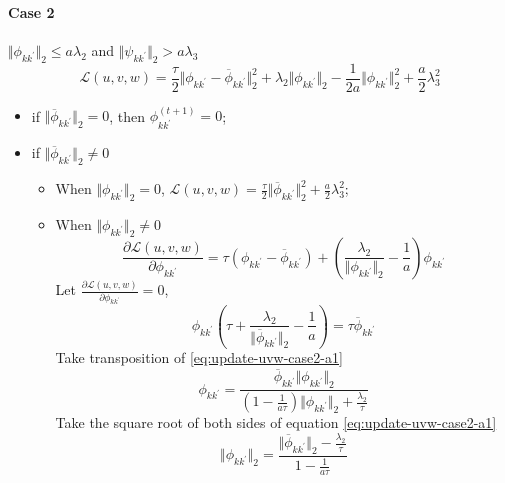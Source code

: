 \documentclass[12pt, a4paper, oneside]{article}
\numberwithin{equation}{section}
\begin{document}
\paragraph{Case 2} $\Vert\phi_{k{k^\prime}}\Vert_2 \leq a\lambda_2$ and $\Vert\psi_{k{k^\prime}}\Vert_2 > a\lambda_3$
\begin{equation}
	\label{eq:update_uvw-case2}
	\mathcal{L}(u,v,w) =  \frac{\tau}{2}\Vert\phi_{k{k^\prime}}-\overline\phi_{k{k^\prime}}\Vert_2^2 + \lambda_2 \Vert\phi_{k{k^\prime}}\Vert_2 - \frac{1}{2a}\Vert\phi_{k{k^\prime}}\Vert_2^2 + \frac{a}{2}\lambda_3^2
\end{equation}
\begin{itemize}
	\item if $\Vert\overline\phi_{k{k^\prime}}\Vert_2 = 0$, then $\phi^{(t+1)}_{k{k^\prime}} = 0$;
	\item if $\Vert\overline\phi_{k{k^\prime}}\Vert_2 \neq 0$
	\begin{itemize}
		\item When $\Vert\phi_{k{k^\prime}}\Vert_2 = 0$, $\mathcal{L}(u,v,w) = \frac{\tau}{2}\Vert\overline\phi_{k{k^\prime}}\Vert_2^2 + \frac{a}{2}\lambda_3^2$;
		\item When $\Vert\phi_{k{k^\prime}}\Vert_2 \neq 0$
	\begin{equation}
	\frac{\partial \mathcal{L}(u,v,w)}{\partial \phi_{k{k^\prime}}} = \tau (\phi_{k{k^\prime}} - \overline\phi_{k{k^\prime}}) + \left(\frac{\lambda_2}{\Vert\phi_{k{k^\prime}}\Vert_2} - \frac{1}{a}\right)\phi_{k{k^\prime}}
	\end{equation}
	Let $\frac{\partial \mathcal{L}(u,v,w)}{\partial \phi_{k{k^\prime}}} = 0$,
	\begin{equation}
	\label{eq:update-uvw-case2-a1}
	\phi_{k{k^\prime}}\left(\tau + \frac{\lambda_2}{\Vert\overline\phi_{k{k^\prime}}\Vert_2} - \frac{1}{a}\right) = \tau \overline\phi_{k{k^\prime}}
	\end{equation}
	Take transposition of \ref{eq:update-uvw-case2-a1}
	\begin{equation}
	\label{eq:update-uvw-case2-a11}
	\phi_{k{k^\prime}} = \frac{\overline\phi_{k{k^\prime}}\Vert\phi_{k{k^\prime}}\Vert_2}{(1-\frac{1}{a\tau})\Vert\phi_{k{k^\prime}}\Vert_2 + \frac{\lambda_2}{\tau}}
	\end{equation}
	Take the square root of both sides of equation \ref{eq:update-uvw-case2-a1}
	\begin{equation}
	\label{eq:update-uvw-case2-a12}
	\Vert\phi_{k{k^\prime}}\Vert_2 = \frac{\Vert\overline\phi_{k{k^\prime}}\Vert_2-\frac{\lambda_2}{\tau}}{1-\frac{1}{a\tau}}

\end{equation}
\end{itemize}
\end{itemize}
\end{document}
